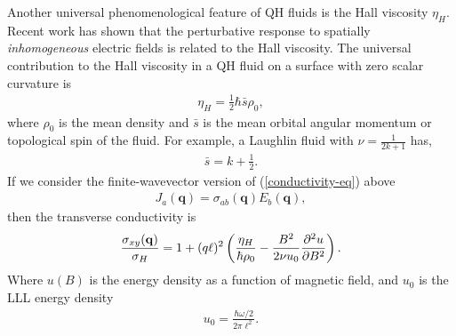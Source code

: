 \documentclass[aps,prb,twocolumn,letterpaper,twoside,nobalancelastpage,groupedaddress,amsmath,amssymb,floatfix,citeautoscript]{revtex4-1}
\begin{document}
Another universal phenomenological feature of QH fluids is the Hall viscosity $\eta_H$. \cite{avron_viscosity_1995,tokatly_lorentz_2007,Read2009} Recent work has shown that the perturbative response to spatially \textit{inhomogeneous} electric fields is related to the Hall viscosity. \cite{hoyos_hall_2012,bradlyn_kubo_2012} The universal contribution to the Hall viscosity in a QH fluid on a surface with zero scalar curvature is \cite{Read2009}
\begin{align*}
\eta_H = \frac{1}{2}\hbar\bar{s}\rho_0,
\end{align*}
where $\rho_0$ is the mean density and $\bar{s}$ is the mean orbital angular momentum or topological spin of the fluid. For example, a Laughlin fluid with $\nu = \frac{1}{2k+1}$ has,
\begin{align*}
\bar{s} = k + \frac{1}{2}.
\end{align*}
If we consider the finite-wavevector version of (\ref{conductivity-eq}) above
\begin{align*}
J_{a}(\mathbf{q}) = \sigma_{ab}(\mathbf{q})E_b(\mathbf{q}),
\end{align*}
then the transverse conductivity is
\begin{align*}
\frac{\sigma_{xy}(\mathbf{q})}{\sigma_H} = 1 + (q\ell)^2\left(\frac{\eta_H}{\hbar \rho_0} - \frac{B^2}{2\nu u_{0}}\pdv[2]{u}{B}\right).
\end{align*}
Where $u(B)$ is the energy density as a function of magnetic field, and $u_0$ is the LLL energy density 
\begin{align*}
u_{0} = \frac{\hbar\omega/2}{2\pi\ell^2}.
\end{align*}
\end{document}
